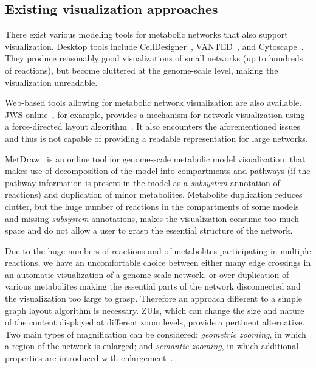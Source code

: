 \documentclass{bmcart}
\begin{document}
\subsection*{Existing visualization approaches}
There exist various modeling tools for metabolic networks that also support visualization. Desktop tools include CellDesigner~\cite{Funahashi2008}, VANTED~\cite{Rohn2012}, and Cytoscape~\cite{Smoot2011}. They produce reasonably good visualizations of small networks (up to hundreds of reactions), but become cluttered at the genome-scale level, making the visualization unreadable. %

Web-based tools allowing for metabolic network visualization are also available. JWS online~\cite{Snoep2003}, for example, provides a mechanism for network visualization using a force-directed layout algorithm~\cite{Fruchterman1991, Tamassia:2007:HGD:1202383}. It also encounters the aforementioned issues and thus is not capable of providing a readable representation for large networks.  

MetDraw~\cite{Jensen2014} is an online tool for genome-scale metabolic model visualization, that makes use of decomposition of the model into compartments and pathways (if the pathway information is present in the model as a \emph{subsystem} annotation of reactions) and duplication of minor metabolites. Metabolite duplication reduces clutter, but the huge number of reactions in the compartments of some models and missing \emph{subsystem} annotations, makes the visualization consume too much space and do not allow a user to grasp the essential structure of the network.

Due to the huge numbers of reactions and of metabolites participating in multiple reactions, we have an uncomfortable choice between either many edge crossings in an automatic visualization of a genome-scale network, or over-duplication of various metabolites making the essential parts of the network disconnected and the visualization too large to grasp. Therefore an approach different to a simple graph layout algorithm is necessary. ZUIs, which can change the size and nature of the content displayed at different zoom levels, provide a pertinent alternative. Two main types of magnification can be considered: \emph{geometric zooming}, in which a region of the network is enlarged; and \emph{semantic zooming}, in which additional properties are introduced with enlargement~\cite{Hu2007}.
\end{document}

